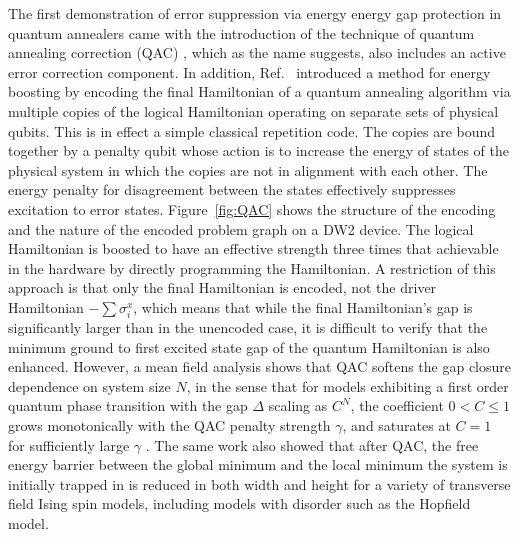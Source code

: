 The first demonstration of error suppression via energy energy gap protection in quantum annealers came with the introduction of the technique of quantum annealing correction (QAC) \cite{PAL:13}, which as the name suggests, also includes an active error correction component. In addition, Ref.~\cite{PAL:13} introduced a method for energy boosting by encoding the final Hamiltonian of a quantum annealing algorithm via multiple copies of the logical Hamiltonian operating on separate sets of physical qubits. This is in effect a simple classical repetition code. The copies are bound together by a penalty qubit whose action is to increase the energy of states of the physical system in which the copies are not in alignment with each other. The energy penalty for disagreement between the states effectively suppresses excitation to error states. Figure~\ref{fig:QAC} shows the structure of the encoding and the nature of the encoded problem graph on a DW2 device. The logical Hamiltonian is boosted to have an effective strength three times that achievable in the hardware by directly programming the Hamiltonian. A restriction of this approach is that only the final Hamiltonian is encoded, not the driver Hamiltonian $-\sum \sigma_i^x$, which means that while the final Hamiltonian's gap is significantly larger than in the unencoded case, it is difficult to verify that the minimum ground to first excited state gap of the quantum Hamiltonian is also enhanced. However, a mean field analysis shows that QAC softens the gap closure dependence on system size $N$, in the sense that for models exhibiting a first order quantum phase transition with the gap $\Delta$ scaling as $C^N$, the coefficient $0<C\leq 1$ grows monotonically with the QAC penalty strength $\gamma$, and saturates at $C=1$ for sufficiently large $\gamma$ \cite{MNAL:15,matsuura2017qac}. The same work also showed that after QAC, the free energy barrier between the global minimum and the local minimum the system is initially trapped in is reduced in both width and height for a variety of transverse field Ising spin models, including models with disorder such as the Hopfield model.

